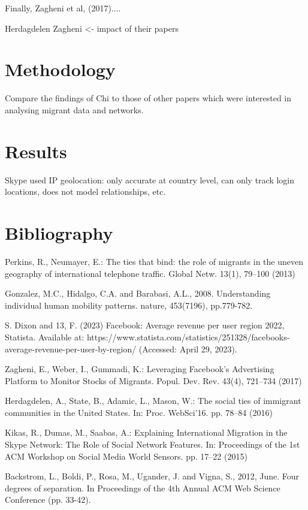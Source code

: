 \documentclass[12pt]{article}
\begin{document}
Finally, Zagheni et al, (2017)....

Herdagdelen Zagheni <- impact of their papers


\section{Methodology}
Compare the findings of Chi to those of other papers which were interested in analysing 
migrant data and networks.

\section{Results}
Skype used IP geolocation: only accurate at country level, can only track login 
locations, does not model relationships, etc.

\pagebreak 
\section{Bibliography}

Perkins, R., Neumayer, E.: The ties that bind: the role of migrants in the uneven
geography of international telephone traffic. Global Netw. 13(1), 79–100 (2013)

Gonzalez, M.C., Hidalgo, C.A. and Barabasi, A.L., 2008. Understanding individual human mobility patterns. nature, 453(7196), pp.779-782.

S. Dixon and 13, F. (2023) Facebook: Average revenue per user region 2022, Statista. Available at: https://www.statista.com/statistics/251328/facebooks-average-revenue-per-user-by-region/ (Accessed: April 29, 2023). 

Zagheni, E., Weber, I., Gummadi, K.: Leveraging Facebook’s Advertising Platform
to Monitor Stocks of Migrants. Popul. Dev. Rev. 43(4), 721–734 (2017)

Herdagdelen, A., State, B., Adamic, L., Mason, W.: The social ties of immigrant
communities in the United States. In: Proc. WebSci’16. pp. 78–84 (2016)

Kikas, R., Dumas, M., Saabas, A.: Explaining International Migration in the Skype
Network: The Role of Social Network Features. In: Proceedings of the 1st ACM
Workshop on Social Media World Sensors. pp. 17–22 (2015)

Backstrom, L., Boldi, P., Rosa, M., Ugander, J. and Vigna, S., 2012, June. Four degrees of separation. In Proceedings of the 4th Annual ACM Web Science Conference (pp. 33-42).
\end{document}
